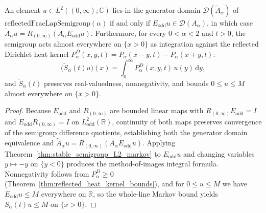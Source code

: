 \begin{theorem}\label{thm:reflected_generator_kernel_markov}
\leanok
An element $u \in L^2((0, \infty); \mathbb{C})$ lies in the generator domain $\mathcal{D}(\widetilde{A}_\alpha)$ of $\mathrm{reflectedFracLapSemigroup}(\alpha)$ if and only if $E_{\mathrm{odd}} u \in \mathcal{D}(A_\alpha)$, in which case $\widetilde{A}_\alpha u = R_{(0,\infty)} (A_\alpha E_{\mathrm{odd}} u)$. Furthermore, for every $0 < \alpha < 2$ and $t > 0$, the semigroup acts almost everywhere on $\{x > 0\}$ as integration against the reflected Dirichlet heat kernel $P_\alpha^D(x, y, t) = P_\alpha(x - y, t) - P_\alpha(x + y, t)$:
\[
  \bigl(\widetilde{S}_\alpha(t) u\bigr)(x) = \int_0^\infty P_\alpha^D(x, y, t)\, u(y)\, \mathrm{d}y,
\]
and $\widetilde{S}_\alpha(t)$ preserves real-valuedness, nonnegativity, and bounds $0 \le u \le M$ almost everywhere on $\{x > 0\}$.
\end{theorem}

\begin{proof}
\leanok
Because $E_{\mathrm{odd}}$ and $R_{(0,\infty)}$ are bounded linear maps with $R_{(0,\infty)} E_{\mathrm{odd}} = I$ and $E_{\mathrm{odd}} R_{(0,\infty)} = I$ on $L^2_{\mathrm{odd}}(\mathbb{R})$, continuity of both maps preserves convergence of the semigroup difference quotients, establishing both the generator domain equivalence and $\widetilde{A}_\alpha u = R_{(0,\infty)}(A_\alpha E_{\mathrm{odd}} u)$. Applying Theorem~\ref{thm:stable_semigroup_L2_markov} to $E_{\mathrm{odd}} u$ and changing variables $y \mapsto -y$ on $\{y < 0\}$ produces the method-of-images integral formula. Nonnegativity follows from $P_\alpha^D \ge 0$ (Theorem~\ref{thm:reflected_heat_kernel_bounds}), and for $0 \le u \le M$ we have $E_{\mathrm{odd}} u \le M$ everywhere on $\mathbb{R}$, so the whole-line Markov bound yields $\widetilde{S}_\alpha(t) u \le M$ on $\{x > 0\}$.
\end{proof}
